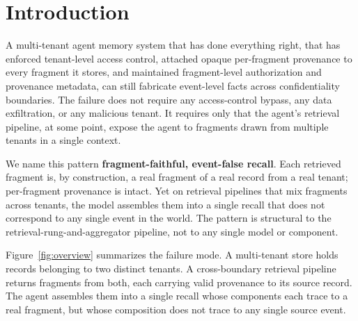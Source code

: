 \documentclass[conference,compsoc]{IEEEtran}
\begin{document}
\section{Introduction}\label{sec:intro}

A multi-tenant agent memory system that has done everything right, that has enforced tenant-level access control, attached opaque per-fragment provenance to every fragment it stores, and maintained fragment-level authorization and provenance metadata, can still fabricate event-level facts across confidentiality boundaries. The failure does not require any access-control bypass, any data exfiltration, or any malicious tenant. It requires only that the agent's retrieval pipeline, at some point, expose the agent to fragments drawn from multiple tenants in a single context.

We name this pattern \textbf{fragment-faithful, event-false recall}. Each retrieved fragment is, by construction, a real fragment of a real record from a real tenant; per-fragment provenance is intact. Yet on retrieval pipelines that mix fragments across tenants, the model assembles them into a single recall that does not correspond to any single event in the world. The pattern is structural to the retrieval-rung-and-aggregator pipeline, not to any single model or component.

Figure~\ref{fig:overview} summarizes the failure mode. A multi-tenant store holds records belonging to two distinct tenants. A cross-boundary retrieval pipeline returns fragments from both, each carrying valid provenance to its source record. The agent assembles them into a single recall whose components each trace to a real fragment, but whose composition does not trace to any single source event.
\end{document}
